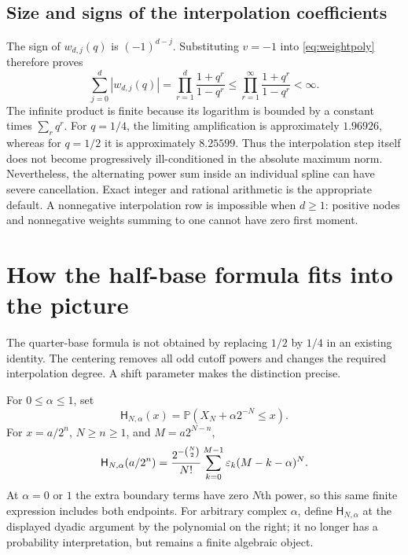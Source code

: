 \documentclass[11pt,oneside]{article}
\theoremstyle{definition}\newtheorem{definition}[theorem]{Definition}
\theoremstyle{remark}\newtheorem{remark}[theorem]{Remark}
\newcommand{\Prob}{\mathbb P}\newcommand{\Up}{\operatorname{up}}
\begin{document}
\subsection{Size and signs of the interpolation coefficients}
The sign of $w_{d,j}(q)$ is $(-1)^{d-j}$. Substituting $v=-1$ into
\eqref{eq:weightpoly} therefore proves
\begin{equation}
 \sum_{j=0}^{d}|w_{d,j}(q)|
 =\prod_{r=1}^{d}\frac{1+q^r}{1-q^r}
 \le\prod_{r=1}^{\infty}\frac{1+q^r}{1-q^r}<\infty.
 \label{eq:weightnorm}
\end{equation}
The infinite product is finite because its logarithm is bounded by a
constant times $\sum_rq^r$. For $q=1/4$, the limiting amplification is
approximately $1.96926$, whereas for $q=1/2$ it is approximately $8.25599$.
Thus the interpolation step itself does not become progressively ill-conditioned
in the absolute maximum norm. Nevertheless, the alternating power sum inside
an individual spline can have severe cancellation. Exact integer and rational
arithmetic is the appropriate default. A nonnegative interpolation row is
impossible when $d\ge1$: positive nodes and nonnegative weights summing to
one cannot have zero first moment.

\section{How the half-base formula fits into the picture}
\label{sec:halfbase}

The quarter-base formula is not obtained by replacing $1/2$ by $1/4$ in an
existing identity. The centering removes all odd cutoff powers and changes
the required interpolation degree. A shift parameter makes the distinction
precise.

For $0\le\alpha\le1$, set
\begin{equation}
 \mathsf H_{N,\alpha}(x)=\Prob(X_N+\alpha2^{-N}\le x).
 \label{eq:shiftCDF}
\end{equation}
For $x=a/2^n$, $N\ge n\ge1$, and $M=a2^{N-n}$,
\begin{equation}
 \mathsf H_{N,\alpha}(a/2^n)
 =\frac{2^{-\binom N2}}{N!}
       \sum_{k=0}^{M-1}\varepsilon_k(M-k-\alpha)^N.
 \label{eq:shiftCDFfinite}
\end{equation}
At $\alpha=0$ or $1$ the extra boundary terms have zero $N$th power,
so this same finite expression includes both endpoints. For arbitrary
complex $\alpha$, define $\mathsf H_{N,\alpha}$ at the displayed dyadic
argument by the polynomial on the right; it no longer has a probability
interpretation, but remains a finite algebraic object.
\end{document}
